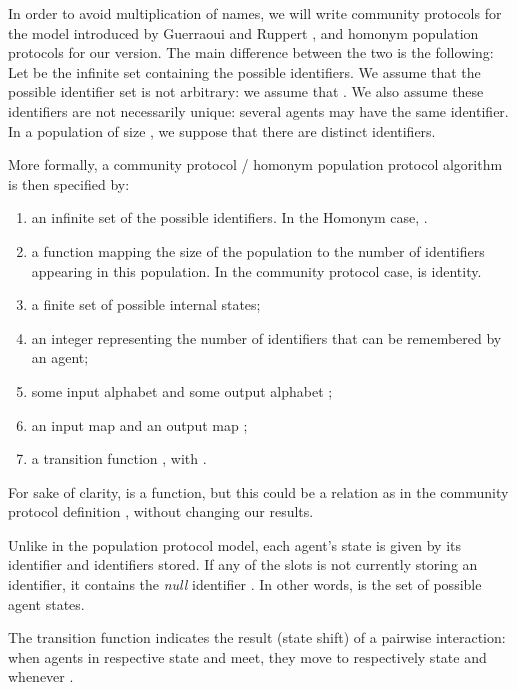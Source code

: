 \documentclass[UKenglish]{llncs}
\newcommand\idd{identifiers}
\begin{document}
In order to avoid multiplication of names, we will write community protocols for the
 model introduced by Guerraoui and Ruppert \cite{guerraoui2009names}, and homonym population protocols
for our version. 
The main difference between the two is the following: 
Let  be the infinite set containing the possible
identifiers. 
We assume that the possible identifier set  is not 
arbitrary: we assume that . 
We also assume these  identifiers are not necessarily
unique: several agents may have the same  identifier.
In a population of size , we suppose that there are  distinct identifiers. 



More formally, a  community  protocol / homonym population protocol
algorithm is then specified by:
\begin{enumerate}
\item an infinite set  of the possible identifiers.
In the Homonym case, .
\item a function  mapping the size of the population to the number of \idd{}  appearing in this population. In the community
protocol case,  is identity. 
\item a finite set  of possible internal states;
\item an integer  representing the number of  {identifier}s that can be
  remembered by an agent;
\item some input alphabet  and some output alphabet ;
\item an input map  and an output map ;
\item a transition function   , with
  .
\end{enumerate}

\begin{remark}
For sake of clarity,   is a function, but this could be a relation as in the community protocol definition
\cite{guerraoui2009names}, without changing our results. 
\end{remark}

\begin{remark} Unlike in the population protocol model, each agent's
  state is given by its  identifier and    identifiers stored.  
If any of the  slots is not currently storing an identifier, it
contains the \emph{null}  identifier .  In other words,
 is the set
of possible agent states.  
\end{remark}

The transition function   indicates the
result (state shift) of a pairwise interaction: when agents in respective state
 and  meet, they move to respectively state  and
 whenever .
\end{document}
